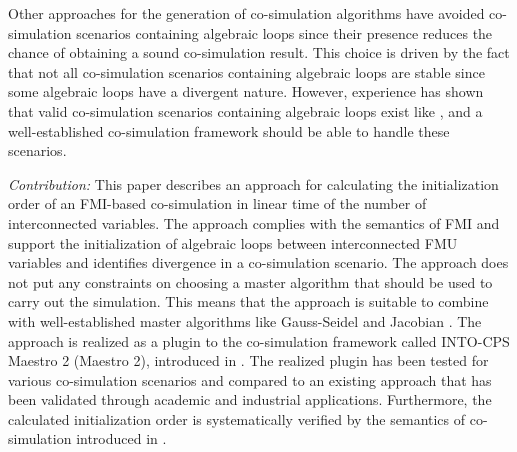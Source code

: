 Other approaches for the generation of co-simulation algorithms have avoided co-simulation scenarios containing algebraic loops since their presence reduces the chance of obtaining a sound co-simulation result\cite{Amalio2016CheckingCo-simulation, BromanCompositionCo-Simulation}. This choice is driven by the fact that not all co-simulation scenarios containing algebraic loops are stable since some algebraic loops have a divergent nature. However, experience has shown that valid co-simulation scenarios containing algebraic loops exist like , and a well-established co-simulation framework should be able to handle these scenarios. 

\textit{Contribution:} This paper describes an approach for calculating the initialization order of an FMI-based co-simulation in linear time of the number of interconnected variables. The approach complies with the semantics of FMI and support the initialization of algebraic loops between interconnected FMU variables and identifies divergence in a co-simulation scenario. The approach does not put any constraints on choosing a master algorithm that should be used to carry out the simulation. 
This means that the approach is suitable to combine with well-established master algorithms like Gauss-Seidel and Jacobian \cite{Palensky2017}. 
The approach is realized as a plugin to the co-simulation framework called INTO-CPS Maestro 2 (Maestro 2), introduced in \cite{Thule2019b}.
The realized plugin has been tested for various co-simulation scenarios and compared to an existing approach that has been validated through academic and industrial applications. 
Furthermore, the calculated initialization order is systematically verified by the semantics of co-simulation introduced in \cite{gomes_lucio_vangheluwe_2019,Gomes2019c}. \\

